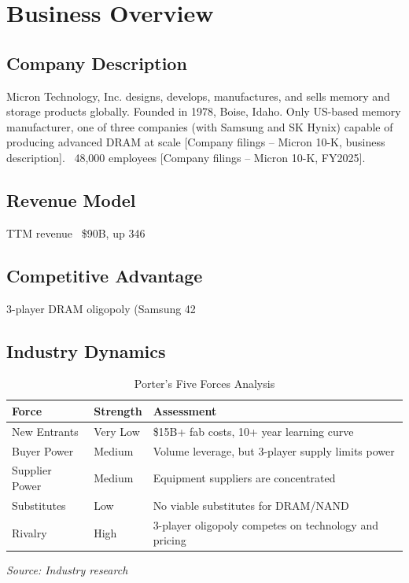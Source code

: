 \documentclass[11pt,a4paper]{report}
\newcommand{\source}[1]{\hfill\small\textit{#1}}
\begin{document}
\chapter{Business Overview}

\section{Company Description}
Micron Technology, Inc. designs, develops, manufactures, and sells memory and storage products globally. Founded in 1978, Boise, Idaho. Only US-based memory manufacturer, one of three companies (with Samsung and SK Hynix) capable of producing advanced DRAM at scale [Company filings -- Micron 10-K, business description]. ~48,000 employees [Company filings -- Micron 10-K, FY2025].

\section{Revenue Model}
TTM revenue ~\$90B, up 346%

\section{Competitive Advantage}
3-player DRAM oligopoly (Samsung 42%

\section{Industry Dynamics}
\begin{table}[H]
\centering
\caption{Porter's Five Forces Analysis}
\begin{tabularx}{\textwidth}{lC{2.5cm}X}
\toprule
\textbf{Force} & \textbf{Strength} & \textbf{Assessment} \\
\midrule
New Entrants & Very Low & \$15B+ fab costs, 10+ year learning curve \\
Buyer Power & Medium & Volume leverage, but 3-player supply limits power \\
Supplier Power & Medium & Equipment suppliers are concentrated \\
Substitutes & Low & No viable substitutes for DRAM/NAND \\
Rivalry & High & 3-player oligopoly competes on technology and pricing
\bottomrule
\end{tabularx}
\source{Source: Industry research}
\end{table}
\end{document}
